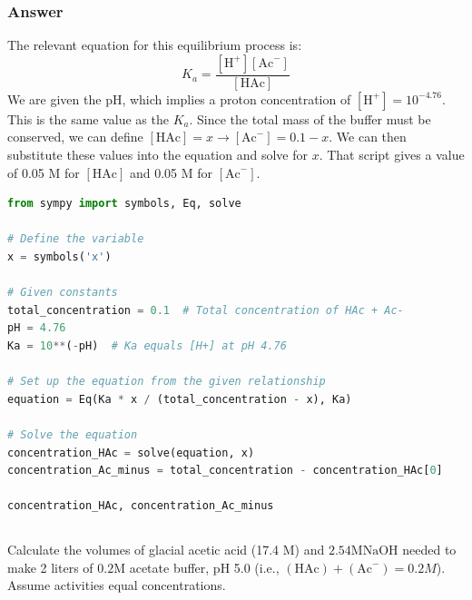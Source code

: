 \documentclass[12pt]{article}
\begin{document}
\subsubsection{Answer}
The relevant equation for this equilibrium process is:
\begin{equation}
  K_a = \frac{[\mathrm{H}^+][\mathrm{Ac}^-]}{[\mathrm{HAc}]}
\end{equation}
We are given the pH, which implies a proton concentration of $[\mathrm{H}^+] = 10^{-4.76}$. This is the same value as the $K_a$. Since the total mass of the buffer must be conserved, we can define $[\mathrm{HAc}] = x \rightarrow [\mathrm{Ac}^-] = 0.1 - x$. We can then substitute these values into the equation and solve for $x$. That script gives a value of 0.05 M for $[\mathrm{HAc}]$ and 0.05 M for $[\mathrm{Ac}^-]$.
\begin{lstlisting}[language=Python]
from sympy import symbols, Eq, solve

# Define the variable
x = symbols('x')

# Given constants
total_concentration = 0.1  # Total concentration of HAc + Ac-
pH = 4.76
Ka = 10**(-pH)  # Ka equals [H+] at pH 4.76

# Set up the equation from the given relationship
equation = Eq(Ka * x / (total_concentration - x), Ka)

# Solve the equation
concentration_HAc = solve(equation, x)
concentration_Ac_minus = total_concentration - concentration_HAc[0]

concentration_HAc, concentration_Ac_minus

\end{lstlisting}
\subsection{}

Calculate the volumes of glacial acetic acid (17.4 M) and $2.54 \mathrm{M} \mathrm{NaOH}$ needed to make 2 liters of $0.2 \mathrm{M}$ acetate buffer, pH 5.0 (i.e., $(\mathrm{HAc})+(\mathrm{Ac}^{-})=0.2 M$). Assume activities equal concentrations.
\end{document}
